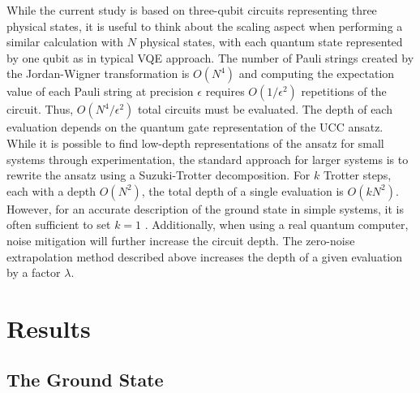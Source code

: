 \documentclass[aps,10pt,superscriptaddress,floatfix,nofootinbib,notitlepage]{revtex4-1}
\begin{document}
While the current study is based on three-qubit circuits representing three physical states, it is useful to think about the scaling aspect when performing a similar calculation with $N$ physical states, with each quantum state represented by one qubit as in typical VQE approach. The number of Pauli strings created by the Jordan-Wigner transformation is $O(N^4)$ and computing the expectation value of each Pauli string at precision $\epsilon$ requires $O(1/\epsilon^2)$ repetitions of the circuit. Thus, $O(N^4/\epsilon^2)$ total circuits must be evaluated. The depth of each evaluation depends on the quantum gate representation of the UCC ansatz. While it is possible to find low-depth representations of the ansatz for small systems through experimentation, the standard approach for larger systems is to rewrite the ansatz using a Suzuki-Trotter decomposition. For $k$ Trotter steps, each with a depth $O(N^2)$, the total depth of a single evaluation is $O(kN^2)$. However, for an accurate description of the ground state in simple systems, it is often sufficient to set $k=1$ \cite{Tilly_2021}. Additionally, when using a real quantum computer, noise mitigation will further increase the circuit depth. The zero-noise extrapolation method described above increases the depth of a given evaluation by a factor $\lambda$.



\section{Results}

\subsection{The Ground State} 
\end{document}
